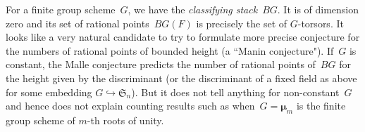 \documentclass[a4paper,english,12pt]{amsart}
\newcommand{\muu}{\boldsymbol{\mu}}
\numberwithin{equation}{subsection}
\begin{document}
For a finite group scheme~$G$, we have the {\it classifying stack}~$BG$. It is of dimension zero and its set of rational points~$BG(F)$ is precisely the set of $G$-torsors. It looks like a very natural candidate to try to formulate more precise conjecture for the numbers of rational points of bounded height (a ``Manin conjecture"). If~$G$ is constant, the Malle conjecture predicts the number of rational points of~$BG$ for the height given by the discriminant (or the discriminant of a fixed field as above for some embedding $G\hookrightarrow \mathfrak S_n$). But it does not tell anything for non-constant~$G$ and hence does not explain counting results such as \cite[Corollary 9.2.5.10]{darda:tel-03682761} when~$G=\muu_m$ is the finite group scheme of $m$-th roots of unity. %
%
%
\end{document}
